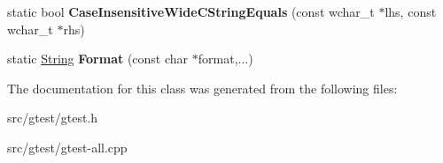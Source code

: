 \begin{DoxyCompactItemize}
\item 
\mbox{\label{classtesting_1_1internal_1_1_string_a1f12d1780ca7afbf8975f5d425b9f362}} 
static bool {\bfseries Case\+Insensitive\+Wide\+C\+String\+Equals} (const wchar\+\_\+t $\ast$lhs, const wchar\+\_\+t $\ast$rhs)
\item 
\mbox{\label{classtesting_1_1internal_1_1_string_adfa58a75d072f348ff9def39a9174df0}} 
static \mbox{\hyperlink{classtesting_1_1internal_1_1_string}{String}} {\bfseries Format} (const char $\ast$format,...)
\end{DoxyCompactItemize}


The documentation for this class was generated from the following files\+:\begin{DoxyCompactItemize}
\item 
src/gtest/gtest.\+h\item 
src/gtest/gtest-\/all.\+cpp\end{DoxyCompactItemize}
